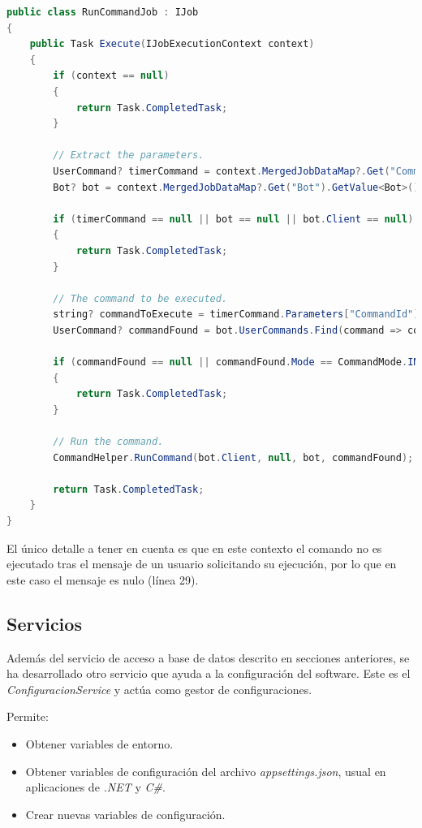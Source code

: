\begin{lstlisting}[language=java]
public class RunCommandJob : IJob
{
    public Task Execute(IJobExecutionContext context)
    {
        if (context == null)
        {
            return Task.CompletedTask;
        }

        // Extract the parameters.
        UserCommand? timerCommand = context.MergedJobDataMap?.Get("Command").GetValue<UserCommand>();
        Bot? bot = context.MergedJobDataMap?.Get("Bot").GetValue<Bot>();

        if (timerCommand == null || bot == null || bot.Client == null)
        {
            return Task.CompletedTask;
        }

        // The command to be executed.
        string? commandToExecute = timerCommand.Parameters["CommandId"].GetValue<string>();
        UserCommand? commandFound = bot.UserCommands.Find(command => command.Id == Guid.Parse(commandToExecute ?? ""));

        if (commandFound == null || commandFound.Mode == CommandMode.INLINE || commandFound.Mode == CommandMode.HEADLESS)
        {
            return Task.CompletedTask;
        }

        // Run the command.
        CommandHelper.RunCommand(bot.Client, null, bot, commandFound);

        return Task.CompletedTask;
    }
}
\end{lstlisting}

El único detalle a tener en cuenta es que en este contexto el comando no es ejecutado tras el mensaje de un usuario solicitando su ejecución, por lo que en este caso el mensaje es nulo (línea 29).


\subsection{Servicios}

Además del servicio de acceso a base de datos descrito en secciones anteriores, se ha desarrollado otro servicio que ayuda a la configuración del software. Este es el \textit{ConfiguracionService} y actúa como gestor de configuraciones.

Permite:

\begin{itemize}
	\item Obtener variables de entorno.
	\item Obtener variables de configuración del archivo \textit{appsettings.json}, usual en aplicaciones de \textit{.NET} y \textit{C\#}.
	\item Crear nuevas variables de configuración.
\end{itemize}


